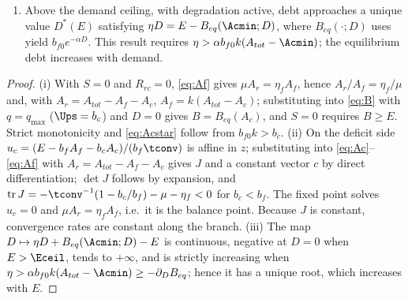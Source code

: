 \begin{proposition}
\begin{enumerate}[label=(\roman*)]
\begin{equation}\label{eq:J}
J=\begin{pmatrix}-\tconv^{-1}-\mu-\eta_f & -\mu-\dfrac{b_c}{b_f\tconv}\\[8pt] \tconv^{-1} & \dfrac{b_c}{b_f\tconv}\end{pmatrix},
\qquad \det J=\frac{\mu+\eta_f}{\tconv}\Big(k-\frac{b_c}{b_f}\Big),
\end{equation}
and $\operatorname{tr}J<0$. The matrix does not depend on demand or on the current state. Its determinant is positive exactly when $B_{eq}$ decreases, and its fixed point is the balance point in (i). For $B_{eq}(A_{tot})\le E<\Eceil$, trajectories that remain in this regime approach that point at rates set by the eigenvalues of $J$. For $E>\Eceil$, the balance point would lie below the allowed minimum: $A_c$ approaches $\Acmin$ asymptotically and the shortfall tends to $S^*=E-\Eceil>0$. Thus the reduced balance curve meets the minimum-area boundary; it does not turn back or form a fold. The leading eigenvalue does not approach zero at $E=\Eceil$, and the reduced equilibrium relation has no hysteresis. These conclusions hold under the stated assumptions and do not imply that the realized land allocation is independent of its history.
\item Above the demand ceiling, with degradation active, debt approaches a unique value $D^*(E)$ satisfying $\eta D=E-B_{eq}(\Acmin;D)$, where $B_{eq}(\cdot;D)$ uses yield $b_{f0}e^{-\alpha D}$. This result requires $\eta>\alpha b_{f0}k(A_{tot}-\Acmin)$; the equilibrium debt increases with demand.
\end{enumerate}
\end{proposition}

\begin{proof}
(i) With $S=0$ and $R_{rc}=0$, \eqref{eq:Af} gives $\mu A_r=\eta_fA_f$, hence $A_r/A_f=\eta_f/\mu$ and, with $A_r=A_{tot}-A_f-A_c$, $A_f=k(A_{tot}-A_c)$; substituting into \eqref{eq:B} with $q=q_{\max}$ ($\Ups=b_c$) and $D=0$ gives $B=B_{eq}(A_c)$, and $S=0$ requires $B\ge E$. Strict monotonicity and \eqref{eq:Acstar} follow from $b_{f0}k>b_c$. (ii) On the deficit side $u_c=(E-b_fA_f-b_cA_c)/(b_f\tconv)$ is affine in $z$; substituting into \eqref{eq:Ac}--\eqref{eq:Af} with $A_r=A_{tot}-A_f-A_c$ gives $J$ and a constant vector $c$ by direct differentiation; $\det J$ follows by expansion, and $\operatorname{tr}J=-\tconv^{-1}(1-b_c/b_f)-\mu-\eta_f<0$ for $b_c<b_f$. The fixed point solves $u_c=0$ and $\mu A_r=\eta_fA_f$, i.e.\ it is the balance point. Because $J$ is constant, convergence rates are constant along the branch. (iii) The map $D\mapsto\eta D+B_{eq}(\Acmin;D)-E$ is continuous, negative at $D=0$ when $E>\Eceil$, tends to $+\infty$, and is strictly increasing when $\eta>\alpha b_{f0}k(A_{tot}-\Acmin)\ge-\partial_DB_{eq}$; hence it has a unique root, which increases with $E$.
\end{proof}

